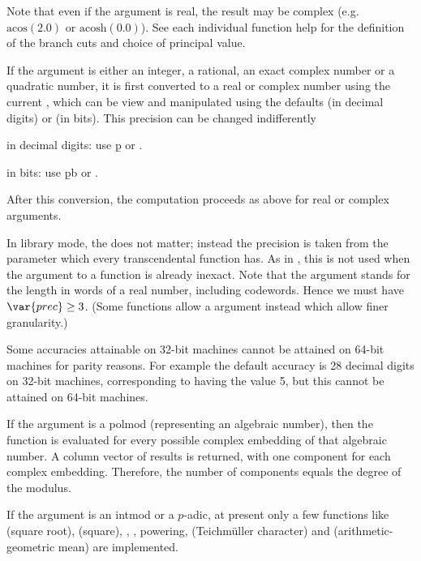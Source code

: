 Note that even if the argument is real, the result may be complex
(e.g.~$\text{acos}(2.0)$ or $\text{acosh}(0.0)$). See each individual
function help for the definition of the branch cuts and choice of principal
value.

\item If the argument is either an integer, a rational, an exact complex
number or a quadratic number, it is first converted to a real
or complex number using the current , which can be
view and manipulated using the defaults  (in decimal
digits) or  (in bits). This precision can be changed
indifferently

\item in decimal digits: use \b{p} or .

\item in bits: use \b{pb} or .

After this conversion, the computation proceeds as above for real or complex
arguments.

In library mode, the  does not matter; instead the
precision is taken from the  parameter which every transcendental
function has. As in , this  is not used when the argument
to a function is already inexact. Note that the argument  stands
for the length in words of a real number, including codewords. Hence we must
have $\var{prec} \geq 3$. (Some functions allow a  argument
instead which allow finer granularity.)

Some accuracies attainable on 32-bit machines cannot be attained
on 64-bit machines for parity reasons. For example the default  accuracy
is 28 decimal digits on 32-bit machines, corresponding to  having
the value 5, but this cannot be attained on 64-bit machines.

\item If the argument is a polmod (representing an algebraic number),
then the function is evaluated for every possible complex embedding of that
algebraic number.  A column vector of results is returned, with one component
for each complex embedding.  Therefore, the number of components equals
the degree of the  modulus.

\item If the argument is an intmod or a $p$-adic, at present only a
few functions like  (square root),  (square), ,
, powering,  (Teichm\"uller character) and
 (arithmetic-geometric mean) are implemented.

